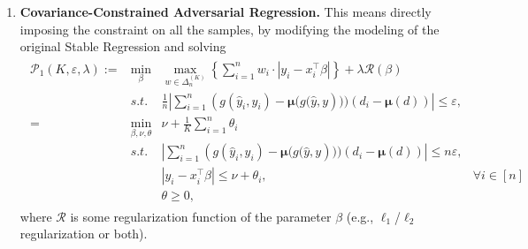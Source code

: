 \documentclass[11pt]{article}
\theoremstyle{plain}
\theoremstyle{definition}
\newcommand{\1}{\mathbf{1}}
\renewcommand{\P}{\mathcal{P}}
\newcommand{\muBold}{\boldsymbol{\mu}}
\renewcommand{\t}{^{\top}}
\begin{document}
\begin{enumerate}
    \item \textbf{Covariance-Constrained Adversarial Regression.} This means directly imposing the constraint on all the samples, by modifying the modeling of the original Stable Regression and solving %
{\everymath{\displaystyle}
\begin{align*}
    \begin{array}{rrll}
    \P_1(K, \varepsilon, \lambda):=&  \min_{\beta}  & \max_{w\in \Delta_{n}^{(K)}} \left\{ \sum_{i=1}^n w_i \cdot|y_i - x_i\t\beta| \right\} + \lambda \mathcal{R}(\beta) &  \\
         & s.t. & \frac{1}{n}\left| \sum_{i=1}^n (g(\hat{y}_i, y_i) - \muBold{(g(\hat{y}, y})))(d_i - \muBold({d})) \right| \leq \varepsilon,\\
         =& \min_{\beta, \nu, \theta} & \nu + \frac{1}{K} \sum_{i=1}^n \theta_i  \\
         & s.t. &\left| \sum_{i=1}^n (g(\hat{y}_i, y_i) - \muBold{(g(\hat{y}, y})))(d_i - \muBold({d})) \right| \leq n \varepsilon ,\\
         && |y_i - x_i\t \beta| \leq \nu + \theta_i, & \forall i \in [n] \\
         && \theta \geq 0,
    \end{array}
\end{align*}}
where $\mathcal{R}$ is some regularization function of the parameter $\beta$ (e.g., $\ell_1$/$\ell_2$ regularization or both).


\end{enumerate}
\end{document}
